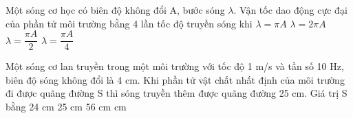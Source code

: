 \begin{vidu} %
Một sóng cơ học có biên độ không đổi A, bước sóng $\lambda$. Vận tốc dao động cực đại của phần tử môi trường bằng 4 lần tốc độ truyền sóng khi
\choice
{$\lambda =\pi A$}
{$\lambda =2\pi A$}
{\True $\lambda =\dfrac{\pi A}{2}$}
{$\lambda =\dfrac{\pi A}{4}$}
\end{vidu} %
\begin{vidu}%
Một sóng cơ lan truyền trong một môi trường với tốc độ 1 m/s và tần số 10 Hz, biên độ sóng không đổi là 4 cm. Khi phần tử vật chất nhất định của môi trường đi được quãng đường S thì sóng truyền thêm được quãng đường 25 cm. Giá trị S bằng
\choice
{24 cm}
{25 cm}
{56 cm}
{ cm}
\end{vidu} %












